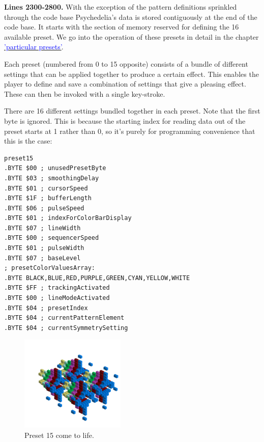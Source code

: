 \clearpage
{}
\textbf{Lines 2300-2800.} With the exception of the pattern definitions sprinkled through the code base Psychedelia's
data is stored contiguously at the end of the code base. It starts with the section of memory reserved for defining
the 16 available preset. We go into the operation of these presets in detail in the chapter
\hyperref[sec:presets]{\textcolor{blue}{'particular presets'}}.

Each preset (numbered from 0 to 15 opposite) consists of a bundle of different settings that can be applied together
to produce a certain effect. This enables the player to define and save a combination of settings that give a pleasing
effect. These can then be invoked with a single key-stroke.

There are 16 different settings bundled together in each preset. Note that the first byte is ignored. This is because
the starting index for reading data out of the preset starts at 1 rather than 0, so it's purely for programming
convenience that this is the case:
\begin{lstlisting}[basicstyle=\ttfamily\scriptsize]
preset15
.BYTE $00 ; unusedPresetByte
.BYTE $03 ; smoothingDelay
.BYTE $01 ; cursorSpeed
.BYTE $1F ; bufferLength
.BYTE $06 ; pulseSpeed
.BYTE $01 ; indexForColorBarDisplay
.BYTE $07 ; lineWidth
.BYTE $00 ; sequencerSpeed
.BYTE $01 ; pulseWidth
.BYTE $07 ; baseLevel
; presetColorValuesArray: 
.BYTE BLACK,BLUE,RED,PURPLE,GREEN,CYAN,YELLOW,WHITE
.BYTE $FF ; trackingActivated
.BYTE $00 ; lineModeActivated
.BYTE $04 ; presetIndex
.BYTE $04 ; currentPatternElement
.BYTE $04 ; currentSymmetrySetting
\end{lstlisting}
\vfill
\begin{figure}[H]                                                          
  \centering                                                             
  \begin{adjustbox}{width=6cm,center}                                   
  \includegraphics[width=5cm]{src/presets/pattern15-45.png}%
  \end{adjustbox}                                                        
\caption{Preset 15 come to life.}                                           
\end{figure}                                                               

